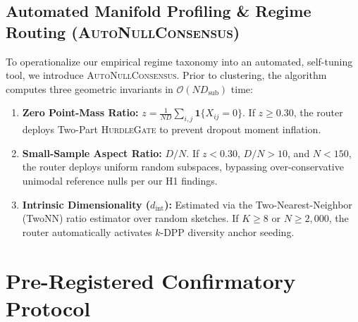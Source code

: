 \documentclass[preprint,12pt]{elsarticle}
\begin{document}
\subsection{Automated Manifold Profiling \& Regime Routing (\textsc{AutoNullConsensus})}
To operationalize our empirical regime taxonomy into an automated, self-tuning tool, we introduce \textsc{AutoNullConsensus}. Prior to clustering, the algorithm computes three geometric invariants in $\mathcal{O}(N D_{\text{sub}})$ time:
\begin{enumerate}
    \item \textbf{Zero Point-Mass Ratio:} $z = \frac{1}{ND}\sum_{i,j}\mathbf{1}\{X_{ij}=0\}$. If $z \ge 0.30$, the router deploys Two-Part \textsc{HurdleGate} to prevent dropout moment inflation.
    \item \textbf{Small-Sample Aspect Ratio:} $D/N$. If $z < 0.30$, $D/N > 10$, and $N < 150$, the router deploys uniform random subspaces, bypassing over-conservative unimodal reference nulls per our H1 findings.
    \item \textbf{Intrinsic Dimensionality ($d_{\text{int}}$):} Estimated via the Two-Nearest-Neighbor (TwoNN) ratio estimator over random sketches. If $K \ge 8$ or $N \ge 2{,}000$, the router automatically activates $k$-DPP diversity anchor seeding.
\end{enumerate}



\section{Pre-Registered Confirmatory Protocol}\label{sec:protocol}
\end{document}

